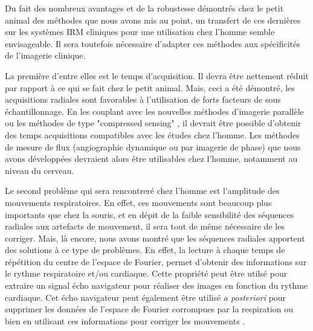 \medskip

Du fait des nombreux avantages et de la robustesse démontrés chez le petit animal des méthodes que nous avons mis au point, un transfert de ces dernières sur les systèmes IRM cliniques pour une utilisation chez l'homme semble envisageable. Il sera toutefois nécessaire d'adapter ces méthodes aux spécificités de l'imagerie clinique.

La première d'entre elles est le temps d'acquisition. Il devra être nettement réduit par rapport à ce qui se fait chez le petit animal. Mais, ceci a été démontré, les acquisitions radiales sont favorables à l'utilisation de forts facteurs de sous échantillonnage. En les couplant avec les nouvelles méthodes d'imagerie parallèle \cite{Lustig:2010fk,Wright:2014aa} ou les méthodes de type "compressed sensing" \cite{Lustig:2008ty,Chan:2012fk,Nam:2013nx}, il devrait être possible d'obtenir des temps acquisitions compatibles avec les études chez l'homme. Les méthodes de mesure de flux (angiographie dynamique ou par imagerie de phase) que nous avons développées devraient alors être utilisables chez l'homme, notamment au niveau du cerveau.

Le second problème qui sera rencontreré chez l'homme est l'amplitude des mouvements respiratoires. En effet, ces mouvements sont beaucoup plus importants que chez la souris, et en dépit de la faible sensibilité des  séquences radiales aux artefacts de mouvement, il sera tout de même nécessaire de les corriger. Mais, là encore, nous avons montré que les séquences radiales apportent des solutions à ce type de problèmes. En effet, la lecture à chaque temps de répétition du centre de l'espace de Fourier, permet d'obtenir des informations sur le rythme respiratoire et/ou cardiaque. Cette propriété peut être utilsé pour extraire un signal écho navigateur pour réaliser des images en fonction du rythme cardiaque. Cet écho navigateur peut également être utilisé \textit{a posteriori} pour supprimer les données de l'espace de Fourier corrompues par la respiration ou bien en utilisant ces informations pour corriger les mouvements \cite{welch2004self,vaillant2014retrospective}.
\medskip

